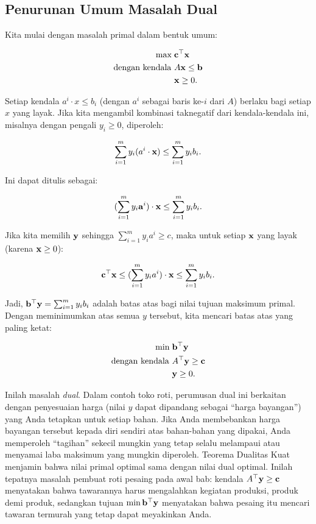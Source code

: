 \subsection*{Penurunan Umum Masalah Dual}

Kita mulai dengan masalah primal dalam bentuk umum:

\[
\begin{aligned}
\max \; & \mathbf{c}^\top \mathbf{x} \\
\mbox{dengan kendala } & A\mathbf{x} \leq \mathbf{b} \\
& \mathbf{x} \geq 0.
\end{aligned}
\]

Setiap kendala $a^i \cdot x \leq b_i$ (dengan $a^i$ sebagai baris ke-$i$ dari $A$) berlaku bagi setiap $x$ yang layak. Jika kita mengambil kombinasi taknegatif dari kendala-kendala ini, misalnya dengan pengali $y_i \geq 0$, diperoleh:

\[
\sum_{i=1}^m y_i (a^i \cdot \mathbf{x}) \leq \sum_{i=1}^m y_i b_i.
\]

Ini dapat ditulis sebagai:

\[
(\sum_{i=1}^m y_i \mathbf{a}^i) \cdot \mathbf{x} \leq \sum_{i=1}^m y_i b_i.
\]

Jika kita memilih $\mathbf{y}$ sehingga $\sum_{i=1}^m y_i a^i \geq c$, maka untuk setiap $\mathbf{x}$ yang layak (karena $\mathbf{x} \geq 0$):

\[
\mathbf{c}^\top \mathbf{x} \leq (\sum_{i=1}^m y_i a^i)\cdot \mathbf{x} \leq \sum_{i=1}^m y_i b_i.
\]

Jadi, $\mathbf{b}^\top \mathbf{y} = \sum_{i=1}^m y_i b_i$ adalah batas atas bagi nilai tujuan maksimum primal. Dengan meminimumkan atas semua $y$ tersebut, kita mencari batas atas yang paling ketat:

\[
\begin{aligned}
\min \; & \mathbf{b}^\top \mathbf{y} \\
\mbox{dengan kendala } & A^\top \mathbf{y} \geq \mathbf{c} \\
& \mathbf{y} \geq 0.
\end{aligned}
\]

Inilah masalah \emph{dual}. Dalam contoh toko roti, perumusan dual ini berkaitan dengan penyesuaian harga (nilai $y$ dapat dipandang sebagai ``harga bayangan'') yang Anda tetapkan untuk setiap bahan. Jika Anda membebankan harga bayangan tersebut kepada diri sendiri atas bahan-bahan yang dipakai, Anda memperoleh ``tagihan'' sekecil mungkin yang tetap selalu melampaui atau menyamai laba maksimum yang mungkin diperoleh. Teorema Dualitas Kuat menjamin bahwa nilai primal optimal sama dengan nilai dual optimal. Inilah tepatnya masalah pembuat roti pesaing pada awal bab: kendala $A^\top \mathbf{y} \geq \mathbf{c}$ menyatakan bahwa tawarannya harus mengalahkan kegiatan produksi, produk demi produk, sedangkan tujuan $\min \mathbf{b}^\top \mathbf{y}$ menyatakan bahwa pesaing itu mencari tawaran termurah yang tetap dapat meyakinkan Anda.

